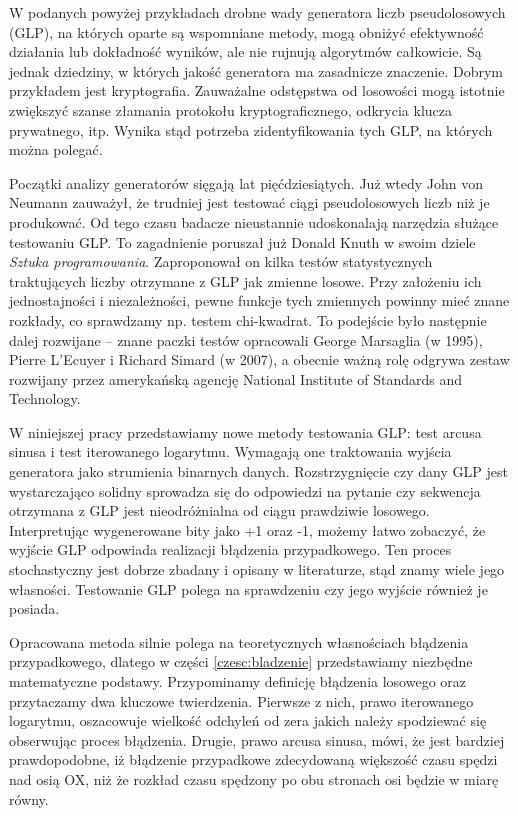 \documentclass[a4paper,11pt,twoside]{book}
\theoremstyle{definition}
\begin{document}
W podanych powyżej przykładach drobne wady generatora liczb pseudolosowych (GLP), na których oparte są wspomniane metody, mogą obniżyć efektywność działania lub dokładność wyników, ale nie rujnują algorytmów całkowicie. Są jednak dziedziny, w których jakość generatora ma zasadnicze znaczenie. Dobrym przykładem jest kryptografia. Zauważalne odstępstwa od losowości mogą istotnie zwiększyć szanse złamania protokołu kryptograficznego, odkrycia klucza prywatnego, itp. Wynika stąd potrzeba zidentyfikowania tych GLP, na których można polegać.

Początki analizy generatorów sięgają lat pięćdziesiątych. Już wtedy John von Neumann zauważył, że trudniej jest testować ciągi pseudolosowych liczb niż je produkować. Od tego czasu badacze nieustannie udoskonalają narzędzia służące testowaniu GLP. To zagadnienie poruszał już Donald Knuth w swoim dziele \emph{Sztuka programowania}. Zaproponował on kilka testów statystycznych traktujących liczby otrzymane z GLP jak zmienne losowe. Przy założeniu ich jednostajności i niezależności, pewne funkcje tych zmiennych powinny mieć znane rozkłady, co sprawdzamy np. testem chi-kwadrat. To podejście było następnie dalej rozwijane -- znane paczki testów opracowali George Marsaglia (w 1995), Pierre L’Ecuyer i Richard Simard (w 2007), a obecnie ważną rolę odgrywa zestaw rozwijany przez amerykańską agencję National Institute of Standards and Technology.

W niniejszej pracy przedstawiamy nowe metody testowania GLP: test arcusa sinusa i test iterowanego logarytmu. Wymagają one traktowania wyjścia generatora jako strumienia binarnych danych. Rozstrzygnięcie czy dany GLP jest wystarczająco solidny sprowadza się do odpowiedzi na pytanie czy sekwencja otrzymana z GLP jest nieodróżnialna od ciągu prawdziwie losowego. Interpretując wygenerowane bity jako +1 oraz -1, możemy łatwo zobaczyć, że wyjście GLP odpowiada realizacji błądzenia przypadkowego. Ten proces stochastyczny jest dobrze zbadany i opisany w literaturze, stąd znamy wiele jego własności. Testowanie GLP polega na sprawdzeniu czy jego wyjście również je posiada.

Opracowana metoda silnie polega na teoretycznych własnościach błądzenia przypadkowego, dlatego w części \ref{czesc:bladzenie} przedstawiamy niezbędne matematyczne podstawy. Przypominamy definicję błądzenia losowego oraz przytaczamy dwa kluczowe twierdzenia. Pierwsze z nich, prawo iterowanego logarytmu, oszacowuje wielkość odchyleń od zera jakich należy spodziewać się obserwując proces błądzenia. Drugie, prawo arcusa sinusa, mówi, że jest bardziej prawdopodobne, iż błądzenie przypadkowe zdecydowaną większość czasu spędzi nad osią OX, niż że rozkład czasu spędzony po obu stronach osi będzie w miarę równy.
\end{document}
